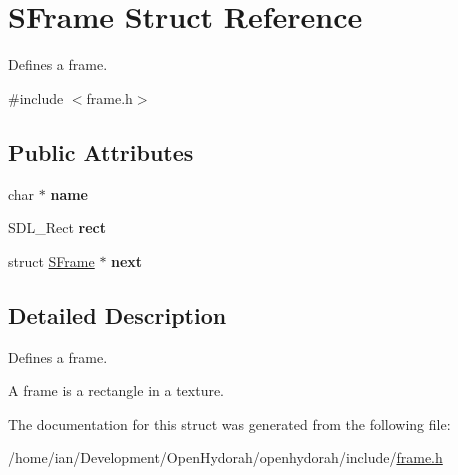 \hypertarget{structSFrame}{\section{S\-Frame Struct Reference}
\label{structSFrame}
}


Defines a frame.  




{\ttfamily \#include $<$frame.\-h$>$}

\subsection*{Public Attributes}
\begin{DoxyCompactItemize}
\item 
\hypertarget{structSFrame_a2c6a793f9cffff1e9d1204a354f61f45}{char $\ast$ {\bfseries name}}\label{structSFrame_a2c6a793f9cffff1e9d1204a354f61f45}

\item 
\hypertarget{structSFrame_a84b0d746e83ccbd11988facdf478cf83}{S\-D\-L\-\_\-\-Rect {\bfseries rect}}\label{structSFrame_a84b0d746e83ccbd11988facdf478cf83}

\item 
\hypertarget{structSFrame_a99a9fa4cc51712fef7c4339f75dcc7a6}{struct \hyperlink{structSFrame}{S\-Frame} $\ast$ {\bfseries next}}\label{structSFrame_a99a9fa4cc51712fef7c4339f75dcc7a6}

\end{DoxyCompactItemize}


\subsection{Detailed Description}
Defines a frame. 

A frame is a rectangle in a texture. 

The documentation for this struct was generated from the following file\-:\begin{DoxyCompactItemize}
\item 
/home/ian/\-Development/\-Open\-Hydorah/openhydorah/include/\hyperlink{frame_8h}{frame.\-h}\end{DoxyCompactItemize}
